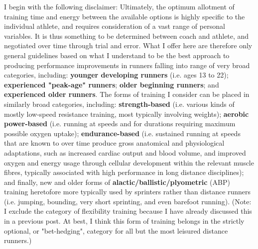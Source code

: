 I begin with the following disclaimer: Ultimately, the optimum allotment of training time and energy between the available options is highly specific to the individual athlete, and requires consideration of a vast range of personal variables. It is thus something to be determined between coach and athlete, and negotiated over time through trial and error. What I offer here are therefore only general guidelines based on what I understand to be the best approach to producing performance improvements in runners falling into range of very broad categories, including: \textbf{younger developing runners} (i.e. ages 13 to 22); \textbf{experienced "peak-age" runners}; \textbf{older beginning runners}; and \textbf{experienced older runners}. The forms of training I consider can be placed in similarly broad categories, including: \textbf{strength-based} (i.e. various kinds of mostly low-speed resistance training, most typically involving weights); \textbf{aerobic power-based} (i.e. running at speeds and for durations requiring maximum possible oxygen uptake); \textbf{endurance-based} (i.e. sustained running at speeds that are known to over time produce gross anatomical and physiological adaptations, such as increased cardiac output and blood volume, and improved oxygen and energy usage through cellular development within the relevant muscle fibres, typically associated with high performance in long distance disciplines); and finally, new and older forms of \textbf{alactic/ballistic/plyometric} (ABP) training heretofore more typically used by sprinters rather than distance runners (i.e. jumping, bounding, very short sprinting, and even barefoot running). (Note: I exclude the category of flexibility training because I have already discussed this in a previous post. At best, I think this form of training belongs in the strictly optional, or "bet-hedging", category for all but the most leisured distance runners.)

